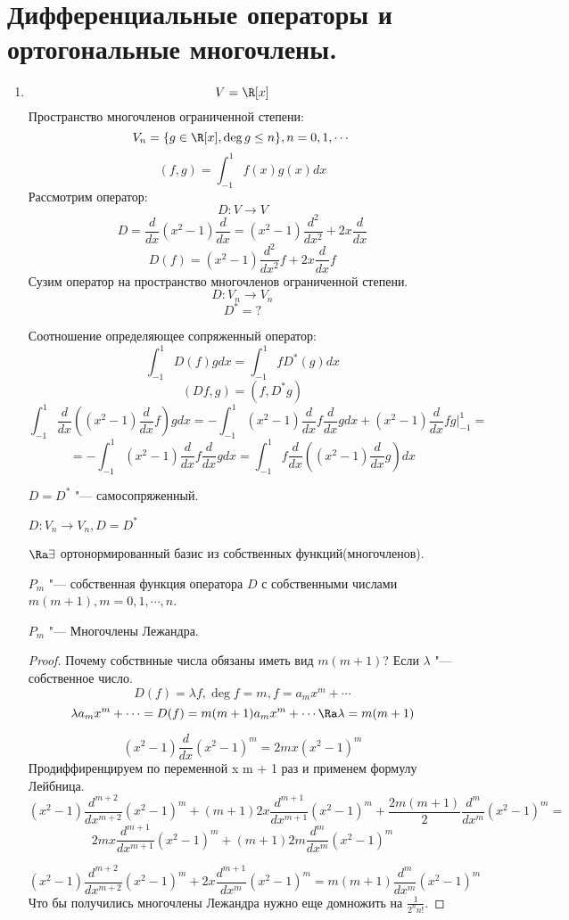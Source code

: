 ﻿\section{Дифференциальные операторы и ортогональные многочлены.}
\begin{enumerate}
\item
$$V = \R[x]$$
Пространство многочленов ограниченной степени:
$$V_n = \{g \in \R[x], \deg g \le n\}, n = 0, 1, \cdots$$
$$(f, g) = \int_{-1}^{1}f(x)g(x)dx$$
Рассмотрим оператор:
$$D \colon V \to V$$
$$D = \frac{d}{dx}(x^2 - 1)\frac{d}{dx} = (x^2 - 1)\frac{d^2}{dx^2} + 2x\frac{d}{dx}$$
$$D(f) = (x^2 - 1)\frac{d^2}{dx^2}f + 2x\frac{d}{dx}f$$
Сузим оператор на пространство многочленов ограниченной степени. 
$$D \colon V_n \to V_n$$
$$D^* = ?$$

Соотношение определяющее сопряженный оператор:
$$\int_{-1}^{1}D(f)gdx = \int_{-1}^{1}fD^*(g)dx$$
$$(Df, g) = (f, D^*g)$$
$$\int_{-1}^{1}\frac{d}{dx}((x^2 - 1)\frac{d}{dx}f)gdx = -\int_{-1}^{1}(x^2 - 1)\frac{d}{dx}f\frac{d}{dx}gdx + (x^2 - 1)\frac{d}{dx}fg|_{-1}^{1} =$$
$$= -\int_{-1}^{1}(x^2 - 1)\frac{d}{dx}f\frac{d}{dx}gdx = \int_{-1}^{1}f\frac{d}{dx}((x^2 - 1)\frac{d}{dx}g)dx$$

$D = D^*$ "--- самосопряженный. 

$D \colon V_n \to V_n, D = D^*$

$\Ra \exists$ ортонормированный базис из собственных функций(многочленов).

\begin{theorem}{}
$P_m$ "--- собственная функция оператора $D$ с собственными числами $m(m + 1), m = 0, 1, \cdots, n$.

$P_m$ "--- Многочлены Лежандра. 
\end{theorem}
\begin{proof}
    Почему собствнные числа обязаны иметь вид $m(m + 1)$?
    Если $\lambda$ "--- собственное число. 
    $$D(f) = \lambda f, \deg f = m, f = a_mx^m + \cdots$$
    $$\lambda a_m x^m + \cdots = D(f) = m(m + 1)a_mx^m + \cdots \Ra \lambda = m(m + 1)$$

    $$(x^2 - 1)\frac{d}{dx}(x^2 - 1)^m = 2mx(x^2 - 1)^m$$
    Продиффиренцируем по переменной x  m + 1 раз и применем формулу Лейбница.
    $$(x^2 - 1)\frac{d^{m + 2}}{dx^{m + 2}}(x^2 - 1)^m + (m + 1)2x\frac{d^{m + 1}}{dx^{m + 1}}(x^2 - 1)^{m} + \frac{2m(m + 1)}{2}\frac{d^m}{dx^m}(x^2 - 1)^m =$$
    $$2mx\frac{d^{m + 1}}{dx^{m + 1}}(x^2 - 1)^m + (m + 1)2m\frac{d^m}{dx^m}(x^2 - 1)^m$$

    $$(x^2 - 1)\frac{d^{m + 2}}{dx^{m + 2}}(x^2 - 1)^m + 2x\frac{d^{m + 1}}{dx^m}(x^2 - 1)^m = m(m + 1)\frac{d^m}{dx^m}(x^2 - 1)^m$$
    Что бы получились многочлены Лежандра нужно еще домножить на $\frac{1}{2^nn!}$.


\end{proof}
\end{enumerate}
